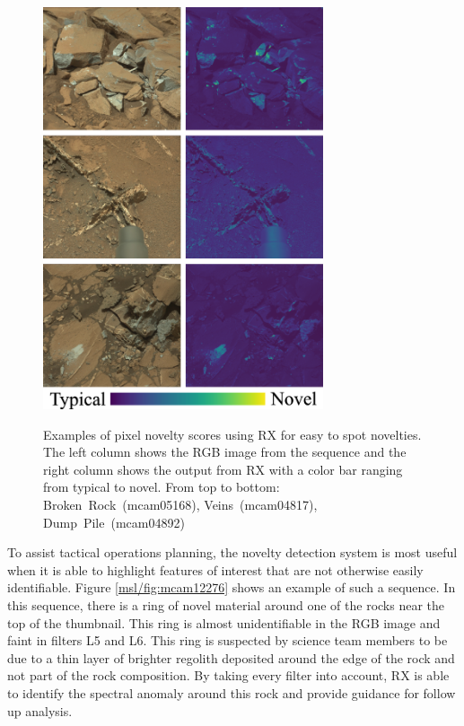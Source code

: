 \begin{figure}
\centering
\includegraphics[width=3.25in]{figs/msl/easy.png}\\
\caption[Examples of Highlighting Novelties with RX for Mastcam Multispectral Images]{Examples of pixel novelty scores using RX for easy to spot novelties. The left column shows the RGB image from the sequence and the right column shows the output from RX with a color bar ranging from typical to novel. From top to bottom: \mbox{Broken Rock (mcam05168)}, \mbox{Veins (mcam04817)}, \mbox{Dump Pile (mcam04892)}}
\label{msl/fig:easyNovel}
\end{figure}

To assist tactical operations planning, the novelty detection system is most useful when it is able to highlight features of interest that are not otherwise easily identifiable. 
Figure \ref{msl/fig:mcam12276} shows an example of such a sequence.
In this sequence, there is a ring of novel material around one of the rocks near the top of the thumbnail. 
This ring is almost unidentifiable in the RGB image and faint in filters L5 and L6. 
This ring is suspected by science team members to be due to a thin layer of brighter regolith deposited around the edge of the rock and not part of the rock composition.
By taking every filter into account, RX is able to identify the spectral anomaly around this rock and provide guidance for follow up analysis.

